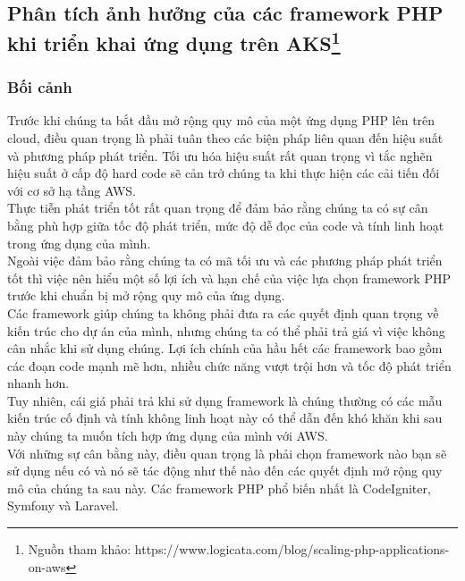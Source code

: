 \subsection{Phân tích ảnh hưởng của các framework PHP khi triển khai ứng dụng trên AKS\protect\footnote{Nguồn tham khảo: https://www.logicata.com/blog/scaling-php-applications-on-aws}}
\subsubsection{Bối cảnh}
    Trước khi chúng ta bắt đầu mở rộng quy mô của một ứng dụng PHP lên trên cloud, điều quan trọng là phải tuân theo các biện pháp liên quan đến hiệu suất và phương pháp phát triển. Tối ưu hóa hiệu suất rất quan trọng vì tắc nghẽn hiệu suất ở cấp độ hard code sẽ cản trở chúng ta khi thực hiện các cải tiến đối với cơ sở hạ tầng AWS.\\[0.5cm]
    Thực tiễn phát triển tốt rất quan trọng để đảm bảo rằng chúng ta có sự cân bằng phù hợp giữa tốc độ phát triển, mức độ dễ đọc của code và tính linh hoạt trong ứng dụng của mình.\\[0.5cm]
    Ngoài việc đảm bảo rằng chúng ta có mã tối ưu và các phương pháp phát triển tốt thì việc nên hiểu một số lợi ích và hạn chế của việc lựa chọn framework PHP trước khi chuẩn bị mở rộng quy mô của ứng dụng.\\[0.5cm]
    Các framework giúp chúng ta không phải đưa ra các quyết định quan trọng về kiến trúc cho dự án của mình, nhưng chúng ta có thể phải trả giá vì việc không cân nhắc khi sử dụng chúng. Lợi ích chính của hầu hết các framework bao gồm các đoạn code mạnh mẽ hơn, nhiều chức năng vượt trội hơn và tốc độ phát triển nhanh hơn.\\[0.5cm]
    Tuy nhiên, cái giá phải trả khi sử dụng framework là chúng thường có các mẫu kiến trúc cố định và tính không linh hoạt này có thể dẫn đến khó khăn khi sau này chúng ta muốn tích hợp ứng dụng của mình với AWS.\\[0.5cm]
    Với những sự cân bằng này, điều quan trọng là phải chọn framework nào bạn sẽ sử dụng nếu có và nó sẽ tác động như thế nào đến các quyết định mở rộng quy mô của chúng ta sau này. Các framework PHP phổ biến nhất là CodeIgniter, Symfony và Laravel.
